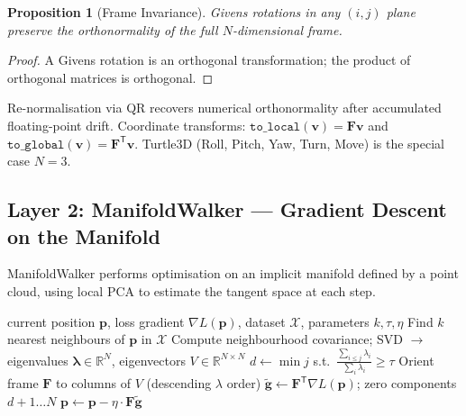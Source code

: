 \documentclass[12pt,letterpaper]{article}
\newtheorem{proposition}{Proposition}
\newcommand{\RR}{\mathbb{R}}
\newcommand{\bF}{\mathbf{F}}
\newcommand{\bp}{\mathbf{p}}
\newcommand{\bg}{\mathbf{g}}
\newcommand{\T}{\mathsf{T}}
\begin{document}
\begin{proposition}[Frame Invariance]
Givens rotations in any $(i,j)$ plane preserve the orthonormality of the full
$N$-dimensional frame.
\end{proposition}
\begin{proof}
A Givens rotation is an orthogonal transformation; the product of orthogonal
matrices is orthogonal.
\end{proof}

Re-normalisation via QR recovers numerical orthonormality after
accumulated floating-point drift.  Coordinate transforms:
$\texttt{to\_local}(\mathbf{v}) = \bF\mathbf{v}$ and
$\texttt{to\_global}(\mathbf{v}) = \bF^\T\mathbf{v}$.
Turtle3D (Roll, Pitch, Yaw, Turn, Move) is the special case $N=3$.

\subsection{Layer 2: ManifoldWalker --- Gradient Descent on the Manifold}
\label{sec:manifoldwalker}

ManifoldWalker performs optimisation on an implicit manifold defined by a point
cloud, using local PCA to estimate the tangent space at each step.

\begin{algorithm}[h]
\caption{ManifoldWalker single step}
\label{alg:walker}
\begin{algorithmic}[1]
\Require current position $\bp$, loss gradient $\nabla L(\bp)$,
         dataset $\mathcal{X}$, parameters $k,\tau,\eta$
\State Find $k$ nearest neighbours of $\bp$ in $\mathcal{X}$
\State Compute neighbourhood covariance; SVD $\to$ eigenvalues
       $\bm\lambda \in \RR^N$, eigenvectors $V \in \RR^{N\times N}$
\State $d \leftarrow \min j$ s.t.\
       $\frac{\sum_{i\le j}\lambda_i}{\sum_i\lambda_i} \ge \tau$
       \quad\Comment{intrinsic dimension}
\State Orient frame $\bF$ to columns of $V$ (descending $\lambda$ order)
\State $\tilde{\bg} \leftarrow \bF^\T\nabla L(\bp)$;
       zero components $d{+}1\ldots N$ \quad{}
\State $\bp \leftarrow \bp - \eta\cdot\bF\tilde{\bg}$
\end{algorithmic}
\end{algorithm}
\end{document}
